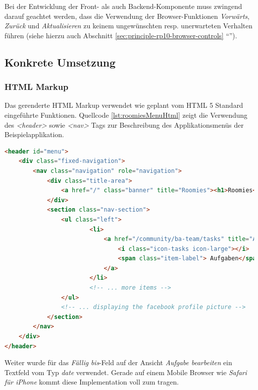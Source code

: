 Bei der Entwicklung der Front- als auch Backend-Komponente muss zwingend darauf geachtet werden, dass die Verwendung der Browser-Funktionen \emph{Vorwärts}, \emph{Zurück} und \emph{Aktualisieren} zu keinem ungewünschten resp. unerwarteten Verhalten führen (siehe hierzu auch Abschnitt \ref{sec:principle-rp10-browser-controls} ``'').


\subsection*{Konkrete Umsetzung}

\subsubsection*{HTML Markup}

Das gerenderte HTML Markup verwendet wie geplant vom HTML 5 Standard eingeführte Funktionen. Quellcode \ref{lst:roomiesMenuHtml} zeigt die Verwendung des \emph{<header>} sowie \emph{<nav>} Tags zur Beschreibung des Applikationsmenüs der Beispielapplikation.

\begin{lstlisting}[language=HTML, caption={Ausschnitt des gerenderten HTML Markups der Menüleiste \emph{roomies}}, label={lst:roomiesMenuHtml}]
<header id="menu">
	<div class="fixed-navigation">
		<nav class="navigation" role="navigation">
			<div class="title-area">
				<a href="/" class="banner" title="Roomies"><h1>Roomies</h1></a>
			</div>
			<section class="nav-section">
				<ul class="left">
						<li>
							<a href="/community/ba-team/tasks" title="Aufgaben">
								<i class="icon-tasks icon-large"></i>
								<span class="item-label"> Aufgaben</span>
							</a>
						</li>
						<!-- ... more items -->
				</ul>
				<!-- ... displaying the facebook profile picture -->
			</section>
		</nav>
	</div>
</header>
\end{lstlisting}

Weiter wurde für das \emph{Fällig bis}-Feld auf der Ansicht \emph{Aufgabe bearbeiten} ein Textfeld vom Typ \emph{date} verwendet. Gerade auf einem Mobile Browser wie \emph{Safari für iPhone} kommt diese Implementation voll zum tragen.

